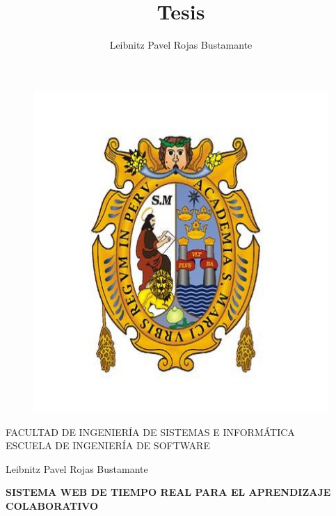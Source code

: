 \begin{titlepage}
\title{Tesis}
\author{Leibnitz Pavel Rojas Bustamante}
\begin{center}
    \vspace*{-1in}
    \begin{figure}[htb]
        \begin{center}
            \includegraphics[scale=0.5]{./figuras/escudo_unmsm.jpg}
        \end{center}
    \end{figure}
    FACULTAD DE INGENIERÍA DE SISTEMAS E INFORMÁTICA\\
    \vspace*{0.5cm}
    ESCUELA DE INGENIERÍA DE SOFTWARE \\
    \vspace*{1cm}
    \begin{large}
    \end{large}
    \vspace*{1cm}
    \begin{center}
        Leibnitz Pavel Rojas Bustamante
    \end{center}
    \vspace*{2cm}
    \begin{Large}
    \textbf{SISTEMA WEB DE TIEMPO REAL PARA EL APRENDIZAJE COLABORATIVO} \\
    \end{Large}
    \vspace*{2cm}

\end{center}
\end{titlepage}

